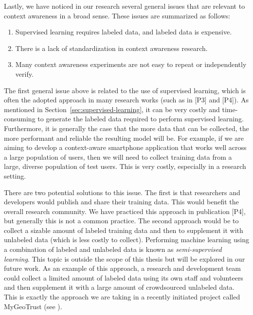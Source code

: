 Lastly, we have noticed in our research several general issues that are relevant to context awareness in a broad sense. These issues are summarized as follows:
%
\begin{enumerate}
 \item Supervised learning requires labeled data, and labeled data is expensive.
 \item There is a lack of standardization in context awareness research.
 \item Many context awareness experiments are not easy to repeat or independently verify.
\end{enumerate}


The first general issue above is related to the use of supervised learning, which is often the adopted approach in many research works (such as in [P3] and [P4]). As mentioned in Section~\ref{sec:supervised-learning}, it can be very costly and time-consuming to generate the labeled data required to perform supervised learning. Furthermore, it is generally the case that the more data that can be collected, the more performant and reliable the resulting model will be. For example, if we are aiming to develop a context-aware smartphone application that works well across a large population of users, then we will need to collect training data from a large, diverse population of test users. This is very costly, especially in a research setting.

There are two potential solutions to this issue. The first is that researchers and developers would publish and share their training data. This would benefit the overall research community. We have practiced this approach in publication [P4], but generally this is not a common practice. The second approach would be to collect a sizable amount of labeled training data and then to supplement it with unlabeled data (which is less costly to collect). Performing machine learning using a combination of labeled and unlabeled data is known as \emph{semi-supervised learning}. This topic is outside the scope of this thesis but will be explored in our future work. As an example of this approach, a research and development team could collect a limited amount of labeled data using its own staff and volunteers and then supplement it with a large amount of crowdsourced unlabeled data. This is exactly the approach we are taking in a recently initiated project called MyGeoTrust (see \cite{Guinness2015}).

